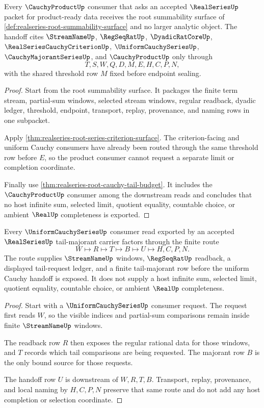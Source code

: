 \begin{theorem}
\label{thm:realseries-root-product-readiness-surface}
Every $\CauchyProductUp$ consumer that asks an accepted $\RealSeriesUp$ packet for product-ready data receives the root summability surface of \autoref{def:realseries-root-summability-surface} and no larger analytic object. The handoff cites $\StreamNameUp$, $\RegSeqRatUp$, $\DyadicRatCoreUp$, $\RealSeriesCauchyCriterionUp$, $\UniformCauchySeriesUp$, $\CauchyMajorantSeriesUp$, and $\CauchyProductUp$ only through
$$
T,S,W,Q,D,M,E,H,C,P,N,
$$
with the shared threshold row $M$ fixed before endpoint sealing.
\end{theorem}
\begin{proof}
Start from the root summability surface. It packages the finite term stream, partial-sum windows, selected stream windows, regular readback, dyadic ledger, threshold, endpoint, transport, replay, provenance, and naming rows in one subpacket.

Apply \autoref{thm:realseries-root-series-criterion-surface}. The criterion-facing and uniform Cauchy consumers have already been routed through the same threshold row before $E$, so the product consumer cannot request a separate limit or completion coordinate.

Finally use \autoref{thm:realseries-root-cauchy-tail-budget}. It includes the $\CauchyProductUp$ consumer among the downstream reads and concludes that no host infinite sum, selected limit, quotient equality, countable choice, or ambient $\RealUp$ completeness is exported.
\end{proof}

\begin{theorem}
\label{thm:realseries-uniform-cauchy-series-handoff}
Every $\UniformCauchySeriesUp$ consumer read exported by an accepted $\RealSeriesUp$ tail-majorant carrier factors through the finite route
$$
W\longmapsto R\longmapsto T\longmapsto B\longmapsto U\longmapsto H,C,P,N .
$$
The route supplies $\StreamNameUp$ windows, $\RegSeqRatUp$ readback, a displayed tail-request ledger, and a finite tail-majorant row before the uniform Cauchy handoff is exposed. It does not supply a host infinite sum, selected limit, quotient equality, countable choice, or ambient $\RealUp$ completeness.
\end{theorem}
\begin{proof}
Start with a $\UniformCauchySeriesUp$ consumer request. The request first reads $W$, so the visible indices and partial-sum comparisons remain inside finite $\StreamNameUp$ windows.

The readback row $R$ then exposes the regular rational data for those windows, and $T$ records which tail comparisons are being requested. The majorant row $B$ is the only bound source for those requests.

The handoff row $U$ is downstream of $W,R,T,B$. Transport, replay, provenance, and local naming by $H,C,P,N$ preserve that same route and do not add any host completion or selection coordinate.
\end{proof}


